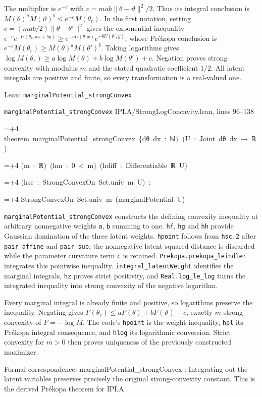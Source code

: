 \documentclass[11pt,a4paper]{article}
\newlength{\leancharwidth}
\newenvironment{leancode}{\par\smallskip\begingroup\ttfamily\footnotesize\raggedright
  \settowidth{\leancharwidth}{M}\setlength{\parskip}{0pt}\setlength{\parindent}{0pt}
  \frenchspacing}{\par\endgroup\smallskip}
\newcommand{\leanline}[2]{\hangindent=\dimexpr#1\leancharwidth+4\leancharwidth\relax
  \hangafter=1\noindent\hspace*{#1\leancharwidth}#2\par}
\newcommand{\leansource}[1]{\par{\footnotesize\color{leanmuted}#1}\par}
\newcommand{\leanlabel}[1]{\par\smallskip\noindent{\small\bfseries #1}\par}
\begin{document}
The multiplier is \(e^{-c}\) with \(c=mab\|\theta-\vartheta\|^2/2\). Thus its integral conclusion is \(M(\theta)^aM(\vartheta)^b\le e^{-c}M(\theta_r)\). In the first notation, setting \(c=(mab/2)\|\theta-\theta'\|^2\) gives the exponential inequality \(e^{-c}e^{-U(\theta_r,ax+by)}\ge e^{-aU(\theta,x)}e^{-bU(\theta',y)}\), whose Prékopa conclusion is \(e^{-c}M(\theta_r)\ge M(\theta)^aM(\theta')^b\). Taking logarithms gives \(\log M(\theta_r)\ge a\log M(\theta)+b\log M(\theta')+c\). Negation proves strong convexity with modulus \(m\) and the stated quadratic coefficient \(1/2\). All latent integrals are positive and finite, so every transformation is a real-valued one.

\begin{leanbox}{Lean: \texttt{marginalPotential\_\allowbreak{}strongConvex}}
\leansource{\texttt{marginalPotential\_\allowbreak{}strongConvex} \quad IPLA/\allowbreak{}StrongLogConcavity.lean, lines 96–138}
\begin{leancode}
\leanline{0}{theorem\ marginalPotential\_strongConvex\ \{dθ\ dx\ :\ ℕ\}\ (U\ :\ Joint\ dθ\ dx\ →\ ℝ)}
\leanline{4}{(m\ :\ ℝ)\ (hm\ :\ 0\ <\ m)\ (hdiff\ :\ Differentiable\ ℝ\ U)}
\leanline{4}{(hsc\ :\ StrongConvexOn\ Set.univ\ m\ U)\ :}
\leanline{4}{StrongConvexOn\ Set.univ\ m\ (marginalPotential\ U)}
\end{leancode}
\leanlabel{How the Lean proof follows the argument}
\texttt{marginal\allowbreak{}Potential\_\allowbreak{}strong\allowbreak{}Convex} constructs the defining convexity inequality at arbitrary nonnegative weights \texttt{a}, \texttt{b} summing to one. \texttt{hf}, \texttt{hg} and \texttt{hh} provide Gaussian domination of the three latent weights. \texttt{hpoint} follows from \texttt{hsc.\allowbreak{}2} after \texttt{pair\_\allowbreak{}affine} and \texttt{pair\_\allowbreak{}sub}; the nonnegative latent squared distance is discarded while the parameter curvature term \texttt{c} is retained. \texttt{Prekopa.\allowbreak{}prekopa\_\allowbreak{}leindler} integrates this pointwise inequality. \texttt{integral\_\allowbreak{}latent\allowbreak{}Weight} identifies the marginal integrals, \texttt{hz} proves strict positivity, and \texttt{Real.\allowbreak{}log\_\allowbreak{}le\_\allowbreak{}log} turns the integrated inequality into strong convexity of the negative logarithm.



Every marginal integral is already finite and positive, so logarithms preserve the inequality. Negating gives \(F(\theta_r)\le aF(\theta)+bF(\vartheta)-c\), exactly \(m\)-strong convexity of \(F=-\log M\). The code's \texttt{hpoint} is the weight inequality, \texttt{hpl} its Prékopa integral consequence, and \texttt{hlog} its logarithmic conversion. Strict convexity for \(m>0\) then proves uniqueness of the previously constructed maximizer.



Formal correspondence: marginalPotential\_strongConvex : Integrating out the latent variables preserves precisely the original strong-convexity constant. This is the derived Prékopa theorem for IPLA.
\end{leanbox}
\end{document}
